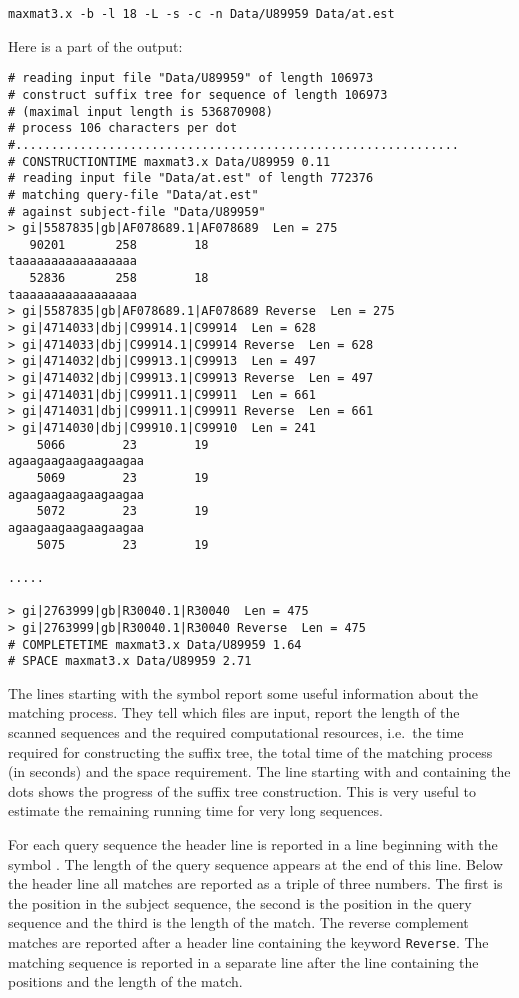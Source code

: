 \documentclass[12pt]{article}
\begin{document}
\begin{verbatim}
maxmat3.x -b -l 18 -L -s -c -n Data/U89959 Data/at.est
\end{verbatim}

Here is a part of the output:

\begin{small}
\begin{verbatim}
# reading input file "Data/U89959" of length 106973
# construct suffix tree for sequence of length 106973
# (maximal input length is 536870908)
# process 106 characters per dot
#..............................................................
# CONSTRUCTIONTIME maxmat3.x Data/U89959 0.11
# reading input file "Data/at.est" of length 772376
# matching query-file "Data/at.est"
# against subject-file "Data/U89959"
> gi|5587835|gb|AF078689.1|AF078689  Len = 275
   90201       258        18
taaaaaaaaaaaaaaaaa
   52836       258        18
taaaaaaaaaaaaaaaaa
> gi|5587835|gb|AF078689.1|AF078689 Reverse  Len = 275
> gi|4714033|dbj|C99914.1|C99914  Len = 628
> gi|4714033|dbj|C99914.1|C99914 Reverse  Len = 628
> gi|4714032|dbj|C99913.1|C99913  Len = 497
> gi|4714032|dbj|C99913.1|C99913 Reverse  Len = 497
> gi|4714031|dbj|C99911.1|C99911  Len = 661
> gi|4714031|dbj|C99911.1|C99911 Reverse  Len = 661
> gi|4714030|dbj|C99910.1|C99910  Len = 241
    5066        23        19
agaagaagaagaagaagaa
    5069        23        19
agaagaagaagaagaagaa
    5072        23        19
agaagaagaagaagaagaa
    5075        23        19

.....

> gi|2763999|gb|R30040.1|R30040  Len = 475
> gi|2763999|gb|R30040.1|R30040 Reverse  Len = 475
# COMPLETETIME maxmat3.x Data/U89959 1.64
# SPACE maxmat3.x Data/U89959 2.71
\end{verbatim}
\end{small}

The lines starting with the symbol \texttt{} report some useful
information about the matching process. They tell which files are input,
report the length of the scanned sequences and the required computational
resources, i.e.\ the time required for constructing the suffix tree,
the total time of the matching process (in seconds) and the space
requirement. The line starting with
\texttt{} and containing the dots shows the progress of the
suffix tree construction. This is very useful to estimate the remaining
running time for very long sequences.

For each query sequence the header line is reported
in a line beginning with the symbol \texttt{}. The length of the
query sequence appears at the end of this line. Below the header line 
all matches are reported as a triple of three numbers. The first is the
position in the subject sequence, the second is the position in the query
sequence and the third is the length of the match. The reverse complement 
matches are reported after a header line containing the keyword 
\texttt{Reverse}. The matching sequence is reported in a separate line after 
the line containing the positions and the length of the match.
\end{document}
